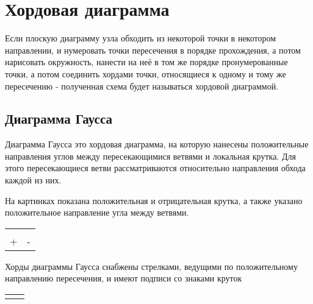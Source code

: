 \section{Хордовая диаграмма}

Если плоскую диаграмму узла обходить из некоторой точки в некотором направлении, и нумеровать точки пересечения в порядке прохождения, а потом нарисовать окружность, нанести на неё в том же порядке пронумерованные точки, а потом соединить хордами точки, относящиеся к одному и тому же пересечению - полученная схема будет называться хордовой диаграммой.

\subsection{Диаграмма Гаусса}

Диаграмма Гаусса это хордовая диаграмма, на которую нанесены положительные направления углов между пересекающимися ветвями и локальная крутка. Для этого пересекающиеся ветви рассматриваются относительно направления обхода каждой из них.

На картинках показана положительная и отрицательная крутка, а также указано положительное направление угла между ветвями.

\graphicspath{{\currentpath}}

\begin{tabular}{
>{\centering\arraybackslash}m{3cm}
>{\centering\arraybackslash}m{3cm}
}

&

\\
+ & -
\end{tabular}

Хорды диаграммы Гаусса снабжены стрелками, ведущими по положительному направлению пересечения, и имеют подписи со знаками круток

\begin{tabular}{
>{\centering\arraybackslash}m{3cm}
>{\centering\arraybackslash}m{3cm}
}

&

\end{tabular}
